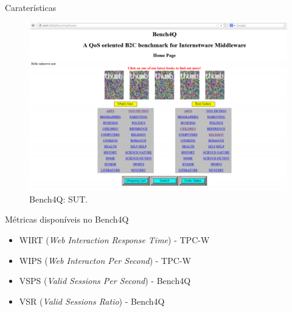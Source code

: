 \begin{frame}{Caraterísticas}
	\begin{figure}
		\begin{center}
			\includegraphics[scale=0.35]{images/sut.png}
			\caption{Bench4Q: SUT.}
			\label{fig:sut-bench4q}
		\end{center}
	\end{figure}
\end{frame}


\begin{frame}{Métricas disponíveis no Bench4Q}
\begin{itemize}
	\item WIRT (\textit{Web Interaction Response Time}) - TPC-W
	\item WIPS (\textit{Web Interacton Per Second}) - TPC-W
	\item VSPS (\textit{Valid Sessions Per Second}) - Bench4Q
	\item VSR (\textit{Valid Sessions Ratio}) - Bench4Q	
\end{itemize}

\end{frame}

